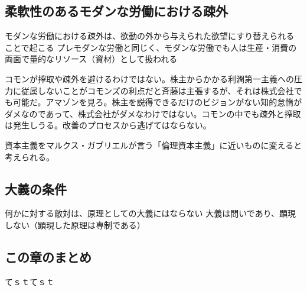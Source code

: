\subsection{柔軟性のあるモダンな労働における疎外}\label{ux67d4ux8edfux6027ux306eux3042ux308bux30e2ux30c0ux30f3ux306aux52b4ux50cdux306bux304aux3051ux308bux758eux5916}

モダンな労働における疎外は、欲動の外から与えられた欲望にすり替えられることで起こる
プレモダンな労働と同じく、モダンな労働でも人は生産・消費の両面で量的なリソース（資材）として扱われる

コモンが搾取や疎外を避けるわけではない。株主からかかる利潤第一主義への圧力に従属しないことがコモンズの利点だと斉藤は主張するが、それは株式会社でも可能だ。アマゾンを見ろ。株主を説得できるだけのビジョンがない知的怠惰がダメなのであって、株式会社がダメなわけではない。コモンの中でも疎外と搾取は発生しうる。改善のプロセスから逃げてはならない。

資本主義をマルクス・ガブリエルが言う「倫理資本主義」に近いものに変えると考えられる。

\subsection{大義の条件}\label{ux5927ux7fa9ux306eux6761ux4ef6}

何かに対する敵対は、原理としての大義にはならない
大義は問いであり、顕現しない（顕現した原理は専制である）

\subsection{この章のまとめ}\label{ux3053ux306eux7ae0ux306eux307eux3068ux3081}

てｓｔてｓｔ
